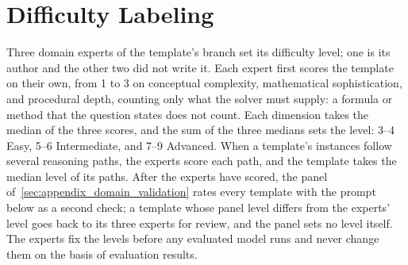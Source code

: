 \section{Difficulty Labeling}
\label{sec:appendix_difficulty}

Three domain experts of the template's branch set its difficulty level; one is its author and the
other two did not write it.
Each expert first scores the template on their own, from 1 to 3 on conceptual complexity,
mathematical sophistication, and procedural depth, counting only what the solver must supply: a
formula or method that the question states does not count.
Each dimension takes the median of the three scores, and the sum of the three medians sets the
level: 3--4 Easy, 5--6 Intermediate, and 7--9 Advanced.
When a template's instances follow several reasoning paths, the experts score each path, and the
template takes the median level of its paths.
After the experts have scored, the panel of~\autoref{sec:appendix_domain_validation} rates every
template with the prompt below as a second check; a template whose panel level differs from the
experts' level goes back to its three experts for review, and the panel sets no level itself.
The experts fix the levels before any evaluated model runs and never change them on the basis of
evaluation results.

